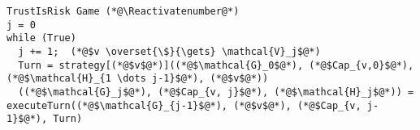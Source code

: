 \Suppressnumber
\begin{lstlisting}[label=trustisriskgame, style=numbers]
TrustIsRisk Game (*@\Reactivatenumber@*)
j = 0
while (True)
  j += 1;  (*@$v \overset{\$}{\gets} \mathcal{V}_j$@*)
  Turn = strategy[(*@$v$@*)]((*@$\mathcal{G}_0$@*), (*@$Cap_{v,0}$@*), (*@$\mathcal{H}_{1 \dots j-1}$@*), (*@$v$@*))
  ((*@$\mathcal{G}_j$@*), (*@$Cap_{v, j}$@*), (*@$\mathcal{H}_j$@*)) = executeTurn((*@$\mathcal{G}_{j-1}$@*), (*@$v$@*), (*@$Cap_{v, j-1}$@*), Turn)
\end{lstlisting}
